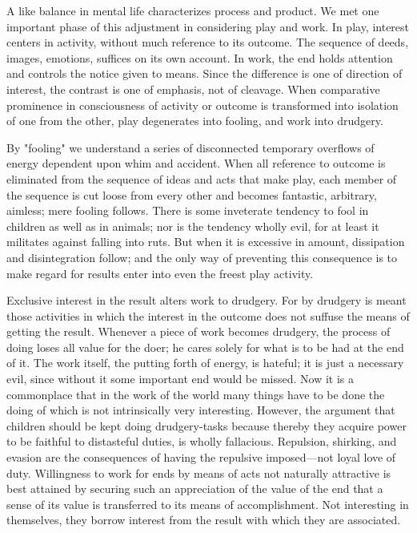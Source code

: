 \documentclass[letterpaper]{book}
\begin{document}
A like balance in mental life characterizes process and product. We met
one important phase of this adjustment in considering play and work. In
play, interest centers in activity, without much reference to its
outcome. The sequence of deeds, images, emotions, suffices on its own
account. In work, the end holds attention and controls the notice given
to means. Since the difference is one of direction of interest, the
contrast is one of emphasis, not of cleavage. When comparative
prominence in consciousness of activity or outcome is transformed into
isolation of one from the other, play degenerates into fooling, and work
into drudgery.


By "fooling" we understand a series of disconnected temporary overflows
of energy dependent upon whim and accident. When all reference to
outcome is eliminated from the sequence of ideas and acts that make
play, each member of the sequence is cut loose from every other and
becomes fantastic, arbitrary, aimless; mere fooling follows. There is
some inveterate tendency to fool in children as well as in animals; nor
is the tendency wholly evil, for at least it militates against falling
into ruts. But when it is excessive in amount, dissipation and
disintegration follow; and the only way of preventing this consequence
is to make regard for results enter into even the freest play
activity.


Exclusive interest in the result alters work to drudgery. For by
drudgery is meant those activities in which the interest in the outcome
does not suffuse the means of getting the result. Whenever a piece of
work becomes drudgery, the process of doing loses all value for the
doer; he cares solely for what is to be had at the end of it. The work
itself, the putting forth of energy, is hateful; it is just a necessary
evil, since without it some important end would be missed. Now it is a
commonplace that in the work of the world many things have to be done
the doing of which is not intrinsically very interesting. However, the
argument that children should be kept doing drudgery-tasks because
thereby they acquire power to be faithful to distasteful duties, is
wholly fallacious. Repulsion, shirking, and evasion are the consequences
of having the repulsive imposed---not loyal love of duty. Willingness to
work for ends by means of acts not naturally attractive is best attained
by securing such an appreciation of the value of the end that a sense of
its value is transferred to its means of accomplishment. Not interesting
in themselves, they borrow interest from the result with which they are
associated.
\end{document}
